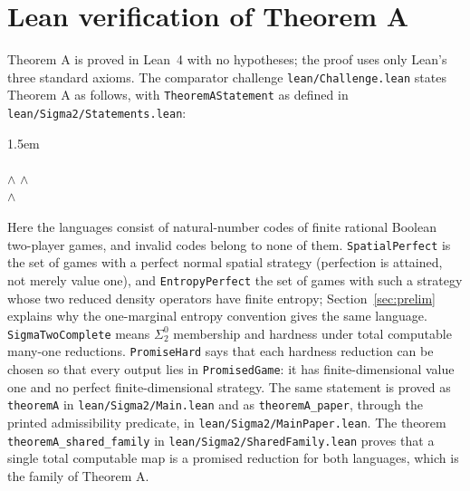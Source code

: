\section{Lean verification of Theorem A}\label{app:leanA}
Theorem A is proved in Lean~4 with no hypotheses; the proof uses only
Lean's three standard axioms. The comparator challenge \nolinkurl{lean/Challenge.lean}
states Theorem A as follows, with \nolinkurl{TheoremAStatement} as defined
in \nolinkurl{lean/Sigma2/Statements.lean}:
\begin{flushleft}\leftskip1.5em\footnotesize\ttfamily\frenchspacing
{}\\[4pt]
\\
\hspace*{1em} $\wedge$  $\wedge$\\
\hspace*{1em} $\wedge$ 
\end{flushleft}
Here the languages consist of natural-number codes of finite rational
Boolean two-player games, and invalid codes belong to none of them.
\texttt{SpatialPerfect} is the set of games with a perfect normal spatial
strategy (perfection is attained, not merely value one), and
\texttt{EntropyPerfect} the set of games with such a strategy whose two
reduced density operators have finite entropy; Section~\ref{sec:prelim}
explains why the one-marginal entropy convention gives the same language.
\texttt{SigmaTwoComplete} means $\Sigma^0_2$ membership and hardness under
total computable many-one reductions. \texttt{PromiseHard} says that each
hardness reduction can be chosen so that every output lies in
\texttt{PromisedGame}: it has finite-dimensional value one and no perfect
finite-dimensional strategy. The same statement is proved as
\nolinkurl{theoremA} in \nolinkurl{lean/Sigma2/Main.lean} and as
\nolinkurl{theoremA_paper}, through the printed admissibility
predicate, in \nolinkurl{lean/Sigma2/MainPaper.lean}. The theorem
\nolinkurl{theoremA_shared_family} in \nolinkurl{lean/Sigma2/SharedFamily.lean}
proves that a single total computable map is a promised reduction for both
languages, which is the family of Theorem A.

